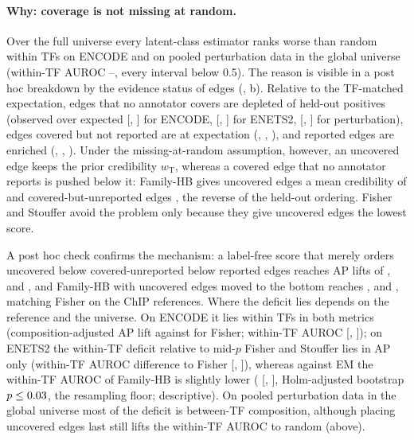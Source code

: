 \paragraph{Why: coverage is not missing at random.}
Over the full universe every latent-class estimator ranks worse than random within TFs on ENCODE and on pooled perturbation data in the global universe (within-TF AUROC \nAucLcmMin{}--\nAucLcmMax{}, every interval below 0.5).
The reason is visible in a post hoc breakdown by the evidence status of edges (, b).
Relative to the TF-matched expectation, edges that no annotator covers are depleted of held-out positives (observed over expected \nStUnobsEnc{} [\nStUnobsEncLo{}, \nStUnobsEncHi{}] for ENCODE, \nStUnobsEnet{} [\nStUnobsEnetLo{}, \nStUnobsEnetHi{}] for ENETS2, \nStUnobsPert{} [\nStUnobsPertLo{}, \nStUnobsPertHi{}] for perturbation), edges covered but not reported are at expectation (\nStObsnegEnc{}, \nStObsnegEnet{}, \nStObsnegPert{}), and reported edges are enriched (\nStRepEnc{}, \nStRepEnet{}, \nStRepPert{}).
Under the missing-at-random assumption, however, an uncovered edge keeps the prior credibility $w_{\mathrm{T}}$, whereas a covered edge that no annotator reports is pushed below it: Family-HB gives uncovered edges a mean credibility of \nStCredUnobs{} and covered-but-unreported edges \nStCredObsneg{}, the reverse of the held-out ordering.
Fisher and Stouffer avoid the problem only because they give uncovered edges the lowest score.

A post hoc check confirms the mechanism: a label-free score that merely orders uncovered below covered-unreported below reported edges reaches AP lifts of \nApStatusEnc{}, \nApStatusEnet{} and \nApStatusPert{}, and Family-HB with uncovered edges moved to the bottom reaches \nApUlEnc{}, \nApUlEnet{} and \nApUlPert{}, matching Fisher on the ChIP references.
Where the deficit lies depends on the reference and the universe.
On ENCODE it lies within TFs in both metrics (composition-adjusted AP lift \nAdjHbEnc{} against \nAdjFiEnc{} for Fisher; within-TF AUROC \nAucHbEnc{} [\nAucHbEncLo{}, \nAucHbEncHi{}]); on ENETS2 the within-TF deficit relative to mid-$p$ Fisher and Stouffer lies in AP only (within-TF AUROC difference to Fisher \nPairAucFiEnet{} [\nPairAucFiEnetLo{}, \nPairAucFiEnetHi{}]), whereas against EM the within-TF AUROC of Family-HB is slightly lower (\nPairAucEmEnet{} [\nPairAucEmEnetLo{}, \nPairAucEmEnetHi{}], Holm-adjusted bootstrap $p\le0.03{}$, the resampling floor; descriptive).
On pooled perturbation data in the global universe most of the deficit is between-TF composition, although placing uncovered edges last still lifts the within-TF AUROC to random (above).
